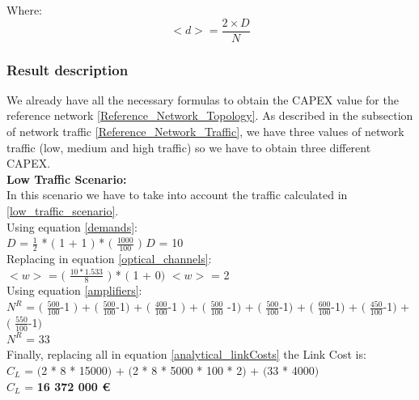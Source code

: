 Where:
\begin{equation}
<d> = \frac{2 \times D}{N}
\label{average_demand}
\end{equation}


\subsubsection{Result description}

We already have all the necessary formulas to obtain the CAPEX value for the reference network \ref{Reference_Network_Topology}. As described in the subsection of network traffic \ref{Reference_Network_Traffic}, we have three values of network traffic (low, medium and high traffic) so we have to obtain three different CAPEX.\\

\textbf{Low Traffic Scenario:}\\
In this scenario we have to take into account the traffic calculated in \ref{low_traffic_scenario}.\\

Using equation \ref{demands}:\\

$D$ = $\frac{1}{2}$ * $($ 1 + 1 $)$ * $($ $\frac{1000}{100}$ $)$ \qquad \qquad $D$ = 10\\

Replacing in equation \ref{optical_channels}:\\

$<w>$ = $($ $\frac{10 * 1.533}{8}$ $)$ * $($ 1 + 0$)$ \qquad \qquad $<w>$ = 2\\

Using equation \ref{amplifiers}:\\

$N^R$ = $($ $\frac{500}{100}$-1 $)$ + $($ $\frac{500}{100}$-1$)$ + $($ $\frac{400}{100}$-1 $)$ + $($ $\frac{500}{100}$ -1$)$ + $($ $\frac{500}{100}$-1$)$ + $($ $\frac{600}{100}$-1$)$ + $($ $\frac{450}{100}$-1$)$ + $($ $\frac{550}{100}$-1$)$\\

$N^R$ = 33\\

Finally, replacing all in equation \ref{analytical_linkCosts} the Link Cost is:\\

$C_L$ = $($2 * 8 * 15000$)$ + $($2 * 8 * 5000 * 100 * 2$)$ + $($33 * 4000$)$\\

$C_L$ = \textbf{16 372 000 \euro}\\

